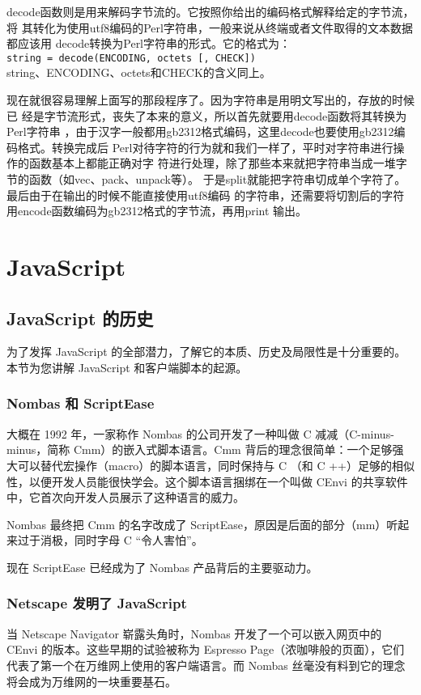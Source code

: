 \documentclass[a4paper,11pt]{book}
\begin{document}
decode函数则是用来解码字节流的。它按照你给出的编码格式解释给定的字节流，将
其转化为使用utf8编码的Perl字符串，一般来说从终端或者文件取得的文本数据都应该用
decode转换为Perl字符串的形式。它的格式为：
\\\lstinline{string = decode(ENCODING, octets [, CHECK])}\\
string、ENCODING、octets和CHECK的含义同上。

现在就很容易理解上面写的那段程序了。因为字符串是用明文写出的，存放的时候已
经是字节流形式，丧失了本来的意义，所以首先就要用decode函数将其转换为Perl字符串
，由于汉字一般都用gb2312格式编码，这里decode也要使用gb2312编码格式。转换完成后
Perl对待字符的行为就和我们一样了，平时对字符串进行操作的函数基本上都能正确对字
符进行处理，除了那些本来就把字符串当成一堆字节的函数（如vec、pack、unpack等）。
于是split就能把字符串切成单个字符了。最后由于在输出的时候不能直接使用utf8编码
的字符串，还需要将切割后的字符用encode函数编码为gb2312格式的字节流，再用print
输出。

\chapter{JavaScript}
\section{JavaScript 的历史}
为了发挥 JavaScript 的全部潜力，了解它的本质、历史及局限性是十分重要的。
本节为您讲解 JavaScript 和客户端脚本的起源。
\subsection{Nombas 和 ScriptEase}

大概在 1992 年，一家称作 Nombas 的公司开发了一种叫做 C 减减（C-minus-minus，简称 Cmm）的嵌入式脚本语言。Cmm 背后的理念很简单：一个足够强大可以替代宏操作（macro）的脚本语言，同时保持与 C （和 C ++）足够的相似性，以便开发人员能很快学会。这个脚本语言捆绑在一个叫做 CEnvi 的共享软件中，它首次向开发人员展示了这种语言的威力。

Nombas 最终把 Cmm 的名字改成了 ScriptEase，原因是后面的部分（mm）听起来过于消极，同时字母 C “令人害怕”。

现在 ScriptEase 已经成为了 Nombas 产品背后的主要驱动力。


\subsection{Netscape 发明了 JavaScript}

当 Netscape Navigator 崭露头角时，Nombas 开发了一个可以嵌入网页中的 CEnvi 的版本。这些早期的试验被称为 Espresso Page（浓咖啡般的页面），它们代表了第一个在万维网上使用的客户端语言。而 Nombas 丝毫没有料到它的理念将会成为万维网的一块重要基石。
\end{document}
